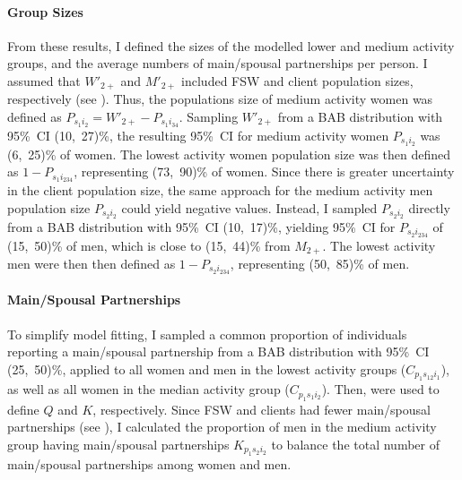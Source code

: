 \paragraph{Group Sizes}
From these results, I defined the sizes of the modelled lower and medium activity groups,
and the average numbers of main/spousal partnerships per person.
I assumed that $W'_{2+}$ and $M'_{2+}$ included FSW and client population sizes, respectively
(see ).
Thus, the populations size of medium activity women was defined as
$P_{s_{1}i_{2}} = W'_{2+} - P_{s_{1}i_{34}}$.
Sampling $W'_{2+}$ from a BAB distribution with 95\%~CI (10,~27)\%,
the resulting 95\%~CI for medium activity women $P_{s_{1}i_{2}}$ was (6,~25)\% of women.
The lowest activity women population size was then defined as $1 - P_{s_{1}i_{234}}$,
representing (73,~90)\% of women.
Since there is greater uncertainty in the client population size,
the same approach for the medium activity men population size $P_{s_{2}i_{2}}$
could yield negative values.
Instead, I sampled $P_{s_{2}i_{2}}$ directly from
a BAB distribution with 95\%~CI (10,~17)\%, yielding
95\%~CI for $P_{s_{2}i_{234}}$ of (15,~50)\% of men,
which is close to (15,~44)\% from $M_{2+}$.
The lowest activity men were then then defined as $1 - P_{s_{2}i_{234}}$,
representing (50,~85)\% of men.
\paragraph{Main/Spousal Partnerships}
To simplify model fitting, I sampled a common proportion of
individuals reporting a main/spousal partnership from a BAB distribution with 95\%~CI (25,~50)\%,
applied to all women and men in the lowest activity groups ($C_{p_{1}s_{12}i_{1}}$),
as well as all women in the median activity group ($C_{p_{1}s_{1}i_{2}}$).
Then,  were used to define $Q$ and $K$, respectively.
Since FSW and clients had fewer main/spousal partnerships (see ),
I calculated the proportion of men in the medium activity group having main/spousal partnerships
$K_{p_{1}s_{2}i_{2}}$ to balance the total number of main/spousal partnerships among women and men.

